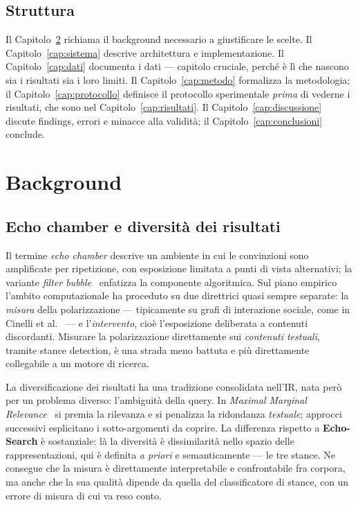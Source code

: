 \documentclass[11pt,a4paper]{report}
\newcommand{\ES}{\textbf{Echo-Search}}
\begin{document}
\section{Struttura}
Il Capitolo~\ref{cap:sota} richiama il background necessario a giustificare le scelte. Il
Capitolo~\ref{cap:sistema} descrive architettura e implementazione. Il
Capitolo~\ref{cap:dati} documenta i dati --- capitolo cruciale, perché è lì che nascono sia i
risultati sia i loro limiti. Il Capitolo~\ref{cap:metodo} formalizza la metodologia; il
Capitolo~\ref{cap:protocollo} definisce il protocollo sperimentale \emph{prima} di vederne i
risultati, che sono nel Capitolo~\ref{cap:risultati}. Il Capitolo~\ref{cap:discussione}
discute findings, errori e minacce alla validità; il Capitolo~\ref{cap:conclusioni} conclude.

\chapter{Background}\label{cap:sota}

\section{Echo chamber e diversità dei risultati}
Il termine \emph{echo chamber} descrive un ambiente in cui le convinzioni sono amplificate per
ripetizione, con esposizione limitata a punti di vista alternativi; la variante \emph{filter
bubble}~\cite{pariser} enfatizza la componente algoritmica. Sul piano empirico l'ambito
computazionale ha proceduto su due direttrici quasi sempre separate: la \emph{misura} della
polarizzazione --- tipicamente su grafi di interazione sociale, come in Cinelli et
al.~\cite{cinelli} --- e l'\emph{intervento}, cioè l'esposizione deliberata a contenuti
discordanti. Misurare la polarizzazione direttamente sui \emph{contenuti testuali}, tramite
stance detection, è una strada meno battuta e più direttamente collegabile a un motore di
ricerca.

La diversificazione dei risultati ha una tradizione consolidata nell'IR, nata però per un
problema diverso: l'ambiguità della query. In \emph{Maximal Marginal Relevance}~\cite{mmr} si
premia la rilevanza e si penalizza la ridondanza \emph{testuale}; approcci successivi
esplicitano i sotto-argomenti da coprire. La differenza rispetto a \ES{} è sostanziale: là la
diversità è dissimilarità nello spazio delle rappresentazioni, qui è definita \emph{a priori}
e semanticamente --- le tre stance. Ne consegue che la misura è direttamente interpretabile e
confrontabile fra corpora, ma anche che la sua qualità dipende da quella del classificatore di
stance, con un errore di misura di cui va reso conto.
\end{document}
